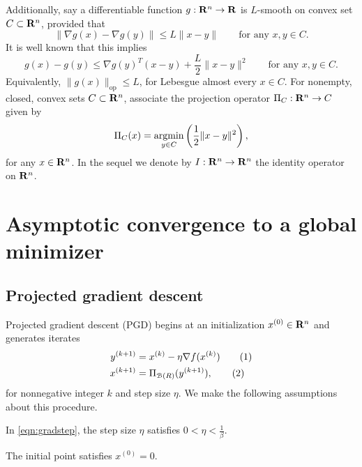 \documentclass[11pt]{article}
\newcommand{\proj}{\ensuremath{\Pi_{\B(R)}}}
\newcommand\numberthis{\addtocounter{equation}{1}\tag{\theequation}}
\begin{document}
Additionally, say a differentiable function $g: \mathbf{R}^n \to \mathbf{R}$ is 
$L$-smooth on convex set $C \subset \mathbf{R}^n$, provided that 
\[
\|\nabla g(x) - \nabla g(y)\| \leq L \|x - y\| \qquad 
\text{for any $x, y \in C$}.
\]
It is well known that this implies 
\begin{equation}\label{ineq:smoothness}
g(x) - g(y) \leq  \nabla g(y)^T(x - y) + \frac{L}{2}\|x -y\|^2 \qquad 
\text{for any $x, y \in C$}.
\end{equation}
Equivalently, $\|g(x)\|_\mathrm{op} \leq L$, for Lebesgue almost every $x \in C$. For nonempty, closed, convex sets $C 
\subset \mathbf{R}^n$, associate the projection operator $\Pi_C: \mathbf{R}^n \to C$ given by 
\[
\Pi_C(x) = \mathop{\rm argmin}_{y \in C} \left( \frac12 \|x - y\|^2 \right), 
\]
for any $x \in \mathbf{R}^n$. In the sequel we denote by $I: \mathbf{R}^n \to \mathbf{R}^n$ the identity operator on $\mathbf{R}^n$.

\section{Asymptotic convergence to a global minimizer}\label{sec:prelims}

\subsection{Projected gradient descent}
Projected gradient descent (PGD) begins at an initialization $x^{(0)} \in \mathbf{R}^n$ and generates iterates
\begin{align*}
    y^{(k + 1)} &= x^{(k)} - \eta \nabla f(x^{(k)}) 
    \numberthis{}\label{eqn:gradstep}\\
    x^{(k + 1)} &= \proj (y^{(k + 1)}),
    \numberthis{}\label{eqn:projectionstep}
\end{align*}
for nonnegative integer $k$ and step size $\eta$. We make the following assumptions about this procedure. 
\begin{assume}\label{assume:A}
In \eqref{eqn:gradstep}, the 
step size $\eta$ satisfies 
$0 < \eta < \frac{1}{\beta}$.
\end{assume}
\begin{assume}\label{assume:B}
The initial point satisfies $x^{(0)} = 0$.
\end{assume}
\end{document}
